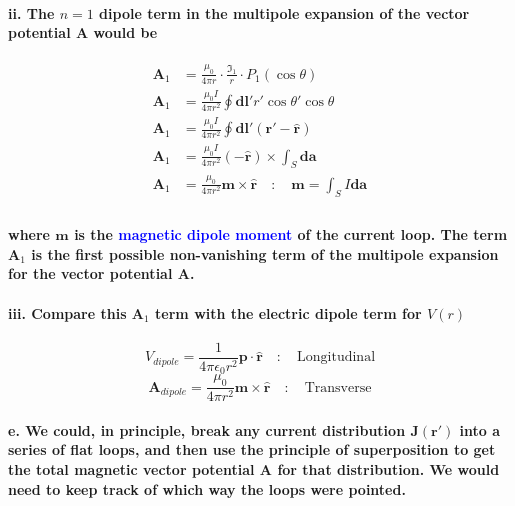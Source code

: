 \documentclass{article}
\begin{document}
\paragraph{\indent\indent ii. The $n=1$ dipole term in the multipole expansion of the vector potential $\boldsymbol{A}$ would be}
\begin{align*}
    \boldsymbol{A}_1&=\frac{\mu_0}{4\pi r}\cdot\frac{\mathfrak{I}_1}{r}\cdot P_1(\cos\theta)  \\
    \boldsymbol{A}_1&=\frac{\mu_0 I}{4\pi r^2}\oint\boldsymbol{dl}'r'\cos\theta'\cos\theta \\
    \boldsymbol{A}_1&=\frac{\mu_0 I}{4\pi r^2}\oint\boldsymbol{dl}'(\boldsymbol{r}'-\hat{\boldsymbol{r}})\\
    \boldsymbol{A}_1&=\frac{\mu_0 I}{4\pi r^2}(-\hat{\boldsymbol{r}})\times\int_S \boldsymbol{da}\\
    \boldsymbol{A}_1&=\frac{\mu_0}{4\pi r^2} \boldsymbol{m}\times\hat{\boldsymbol{r}}\quad:\quad \boldsymbol{m}=\int_S I\boldsymbol{da}\\
\end{align*}    
\paragraph{where $\boldsymbol{m}$ is the \textcolor{blue}{magnetic dipole moment} of the current loop. The term $\boldsymbol{A}_1$ is the first possible non-vanishing term of the multipole expansion for the vector potential $\boldsymbol{A}$.}
\paragraph{\indent\indent iii. Compare this $\boldsymbol{A}_1$ term with the electric dipole term for $V(r)$}
\begin{equation*}
    V_{dipole}=\frac{1}{4\pi\epsilon_0r^2}\boldsymbol{p}\cdot\hat{\boldsymbol{r}}\quad:\quad \text{Longitudinal}
\end{equation*}
\begin{equation*}
    \boldsymbol{A}_{dipole}=\frac{\mu_0}{4\pi r^2}\boldsymbol{m}\times\hat{\boldsymbol{r}}\quad:\quad \text{Transverse}
\end{equation*}
\paragraph{\indent e. We could, in principle, break any current distribution $\boldsymbol{J}(\boldsymbol{r}')$ into a series of flat loops, and then use the principle of superposition to get the total magnetic vector potential $\boldsymbol{A}$ for that distribution. We would need to keep track of which way the loops were pointed.}
\end{document}
